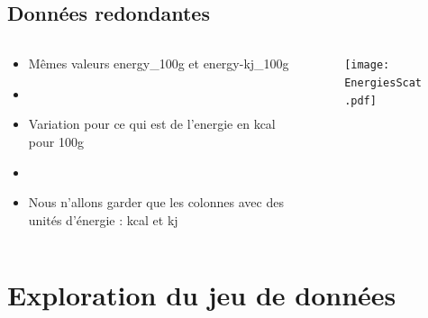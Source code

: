   \subsection{Données redondantes}
    \begin{frame}{\insertsubsection}
      \begin{columns}
        \begin{column}{.4\textwidth}
          \begin{itemize}
            \item Mêmes valeurs energy\_100g et energy-kj\_100g
            \item[]
            \item Variation pour ce qui est de l'energie en kcal pour 100g
            \item[]
            \item Nous n'allons garder que les colonnes avec des unités d'énergie : kcal et kj
          \end{itemize}
        \end{column}
        \begin{column}{.6\textwidth}
          \begin{figure}
            \texttt{[image: EnergiesScat.pdf]}
          \end{figure}
        \end{column}
      \end{columns}
    \end{frame}

\section{Exploration du jeu de données}

